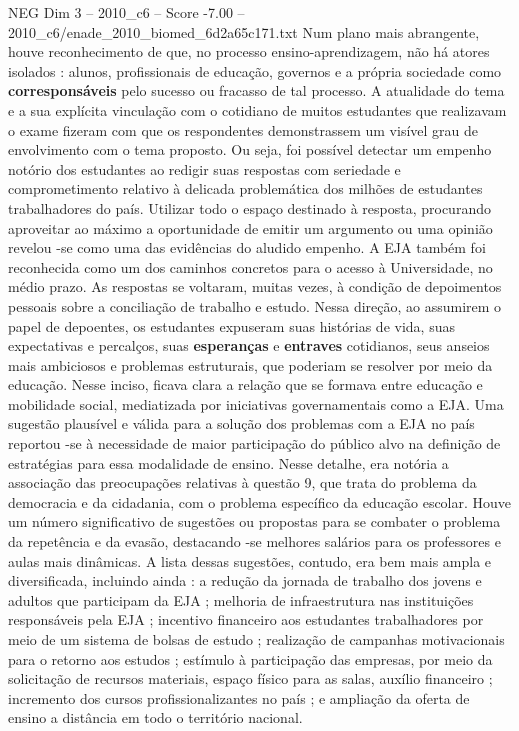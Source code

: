 \begin{textsample}{NEG Dim 3 – 2010\_c6 – Score -7.00 – 2010\_c6/enade\_2010\_biomed\_6d2a65c171.txt}
Num plano mais abrangente, houve reconhecimento de que, no processo ensino-aprendizagem, não há atores isolados : alunos, profissionais de educação, governos e a própria sociedade como \textbf{corresponsáveis} pelo sucesso ou fracasso de tal processo.
A atualidade do tema e a sua explícita vinculação com o cotidiano de muitos estudantes que realizavam o exame fizeram com que os respondentes demonstrassem um visível grau de envolvimento com o tema proposto.
Ou seja, foi possível detectar um empenho notório dos estudantes ao redigir suas respostas com seriedade e comprometimento relativo à delicada problemática dos milhões de estudantes trabalhadores do país.
Utilizar todo o espaço destinado à resposta, procurando aproveitar ao máximo a oportunidade de emitir um argumento ou uma opinião revelou -se como uma das evidências do aludido empenho.
A EJA também foi reconhecida como um dos caminhos concretos para o acesso à Universidade, no médio prazo.
As respostas se voltaram, muitas vezes, à condição de depoimentos pessoais sobre a conciliação de trabalho e estudo.
Nessa direção, ao assumirem o papel de depoentes, os estudantes expuseram suas histórias de vida, suas expectativas e percalços, suas \textbf{esperanças} e \textbf{entraves} cotidianos, seus anseios mais ambiciosos e problemas estruturais, que poderiam se resolver por meio da educação.
Nesse inciso, ficava clara a relação que se formava entre educação e mobilidade social, mediatizada por iniciativas governamentais como a EJA.
Uma sugestão plausível e válida para a solução dos problemas com a EJA no país reportou -se à necessidade de maior participação do público alvo na definição de estratégias para essa modalidade de ensino.
Nesse detalhe, era notória a associação das preocupações relativas à questão 9, que trata do problema da democracia e da cidadania, com o problema específico da educação escolar.
Houve um número significativo de sugestões ou propostas para se combater o problema da repetência e da evasão, destacando -se melhores salários para os professores e aulas mais dinâmicas.
A lista dessas sugestões, contudo, era bem mais ampla e diversificada, incluindo ainda : a redução da jornada de trabalho dos jovens e adultos que participam da EJA ; melhoria de infraestrutura nas instituições responsáveis pela EJA ; incentivo financeiro aos estudantes trabalhadores por meio de um sistema de bolsas de estudo ; realização de campanhas motivacionais para o retorno aos estudos ; estímulo à participação das empresas, por meio da solicitação de recursos materiais, espaço físico para as salas, auxílio financeiro ; incremento dos cursos profissionalizantes no país ; e ampliação da oferta de ensino a distância em todo o território nacional.

\end{textsample}
